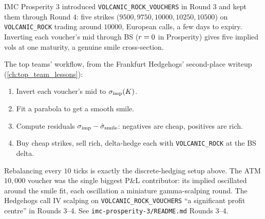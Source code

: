 \begin{prosperitybox}
IMC Prosperity 3 introduced \texttt{VOLCANIC\_ROCK\_VOUCHERS} in
Round 3 and kept them through Round 4: five strikes
($9500, 9750, 10000, 10250, 10500$) on \texttt{VOLCANIC\_ROCK}
trading around $10000$, European calls, a few days to expiry.
Inverting each voucher's mid through BS ($r = 0$ in Prosperity)
gives five implied vols at one maturity, a genuine smile
cross-section.

The top teams' workflow, from the Frankfurt Hedgehogs' second-place
writeup (\cref{ch:top_team_lessons}):
\begin{enumerate}
  \item Invert each voucher's mid to $\sigma_{\text{imp}}(K)$.
  \item Fit a parabola to get a smooth smile.
  \item Compute residuals $\sigma_{\text{imp}} -
  \hat{\sigma}_{\text{smile}}$: negatives are cheap, positives are
  rich.
  \item Buy cheap strikes, sell rich, delta-hedge each with
  \texttt{VOLCANIC\_ROCK} at the BS delta.
\end{enumerate}
Rebalancing every $10$ ticks is exactly the discrete-hedging
setup above. The ATM $10{,}000$ voucher was the single biggest
P\&L contributor: its implied oscillated around the smile fit,
each oscillation a miniature gamma-scalping round. The Hedgehogs
call IV scalping on \texttt{VOLCANIC\_ROCK\_VOUCHERS} ``a
significant profit centre'' in Rounds 3--4. See
\texttt{imc-prosperity-3/README.md} Rounds 3--4.
\end{prosperitybox}

